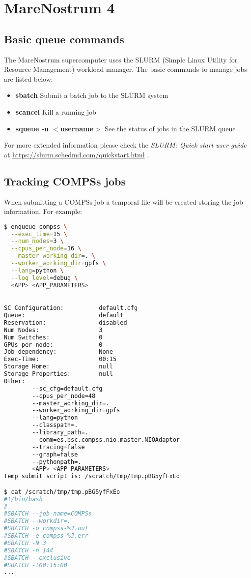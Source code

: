 \section{MareNostrum 4}
\label{sec:marenostrum}

\subsection{Basic queue commands}

The MareNostrum supercomputer uses the SLURM (Simple Linux Utility for Resource Management) workload manager. The basic commands 
to manage jobs are listed below:

\begin{itemize}
 \item \textbf{sbatch} Submit a batch job to the SLURM system
 \item \textbf{scancel} Kill a running job 
 \item \textbf{squeue -u $<$username$>$} See the status of jobs in the SLURM queue
\end{itemize}

For more extended information please check the \textit{SLURM: Quick start user guide} at 
\url{https://slurm.schedmd.com/quickstart.html} .


\subsection{Tracking COMPSs jobs}

When submitting a COMPSs job a temporal file will be created storing the job information. For example:

\begin{lstlisting}[language=bash]
$ enqueue_compss \
  --exec_time=15 \
  --num_nodes=3 \
  --cpus_per_node=16 \
  --master_working_dir=. \
  --worker_working_dir=gpfs \
  --lang=python \
  --log_level=debug \
  <APP> <APP_PARAMETERS>

  
SC Configuration:          default.cfg
Queue:                     default
Reservation:               disabled
Num Nodes:                 3
Num Switches:              0
GPUs per node:             0
Job dependency:            None
Exec-Time:                 00:15
Storage Home:              null
Storage Properties:        null
Other:                     
        --sc_cfg=default.cfg
        --cpus_per_node=48
        --master_working_dir=.
        --worker_working_dir=gpfs
        --lang=python
        --classpath=.
        --library_path=.
        --comm=es.bsc.compss.nio.master.NIOAdaptor
        --tracing=false
        --graph=false
        --pythonpath=.
        <APP> <APP_PARAMETERS>
Temp submit script is: /scratch/tmp/tmp.pBG5yfFxEo

$ cat /scratch/tmp/tmp.pBG5yfFxEo
#!/bin/bash
#
#SBATCH --job-name=COMPSs
#SBATCH --workdir=. 
#SBATCH -o compss-%J.out
#SBATCH -e compss-%J.err
#SBATCH -N 3
#SBATCH -n 144
#SBATCH --exclusive
#SBATCH -t00:15:00 
...
\end{lstlisting}

